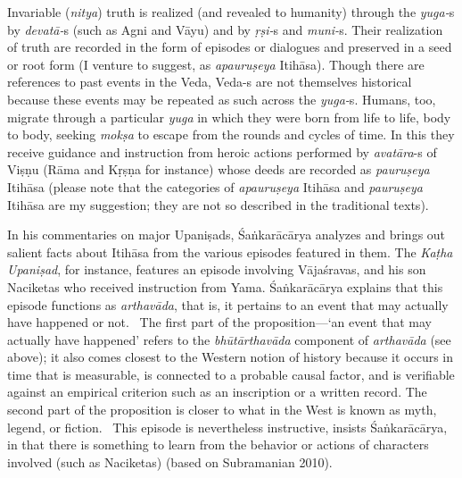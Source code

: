 Invariable (\textit{nitya}) truth is realized (and revealed to humanity) through the \textit{yuga-}s by \textit{devatā-}s (such as Agni and Vāyu) and by \textit{ṛṣi-}s and \textit{muni-}s. Their realization of truth are recorded in the form of episodes or dialogues and preserved in a seed or root form (I venture to suggest, as \textit{apauruṣeya} Itihāsa). Though there are references to past events in the Veda, Veda-s are not themselves historical because these events may be repeated as such across the \textit{yuga-}s. Humans, too, migrate through a particular \textit{yuga} in which they were born from life to life, body to body, seeking \textit{mokṣa} to escape from the rounds and cycles of time. In this they receive guidance and instruction from heroic actions performed by \textit{avatāra}-s of Viṣṇu (Rāma and Kṛṣṇa for instance) whose deeds are recorded as \textit{pauruṣeya} Itihāsa (please note that the categories of \textit{apauruṣeya} Itihāsa and \textit{pauruṣeya} Itihāsa are my suggestion; they are not so described in the traditional texts).

In his commentaries on major Upaniṣads, Śaṅkarācārya analyzes and brings out salient facts about Itihāsa from the various episodes featured in them. The \textit{Kaṭha Upaniṣad}, for instance, features an episode involving Vājaśravas, and his son Naciketas who received instruction from Yama. Śaṅkarācārya explains that this episode functions as \textit{arthavāda}, that is, it pertains to an event that may actually have happened or not.  The first part of the proposition—‘an event that may actually have happened’ refers to the \textit{bhūtārthavāda} component of \textit{arthavāda} (see above); it also comes closest to the Western notion of history because it occurs in time that is measurable, is connected to a probable causal factor, and is verifiable against an empirical criterion such as an inscription or a written record. The second part of the proposition is closer to what in the West is known as myth, legend, or fiction.  This episode is nevertheless instructive, insists Śaṅkarācārya, in that there is something to learn from the behavior or actions of characters involved (such as Naciketas) (based on Subramanian 2010). 

